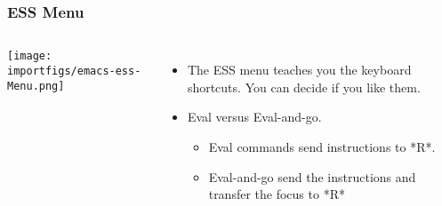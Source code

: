 \documentclass[11pt,english]{beamer}
\newenvironment{topcolumns}{\begin{columns}[t]}{\end{columns}}
\begin{document}
\begin{frame}
  \frametitle{ESS Menu}
  \begin{topcolumns}%

    \column{6cm}


    \texttt{[image: importfigs/emacs-ess-Menu.png]}


    \column{6cm}
    \begin{itemize}
    \item The ESS menu teaches you the keyboard shortcuts. You can decide if
      you like them.
    \item Eval versus Eval-and-go. 

      \begin{itemize}
      \item Eval commands send instructions to {*}R{*}. 
      \item Eval-and-go send the instructions and transfer the focus to {*}R{*}
      \end{itemize}
    \end{itemize}
  \end{topcolumns}%
\end{frame}
\end{document}
